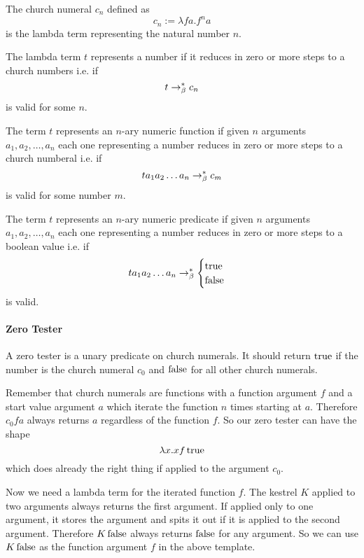 \begin{definition}
  The church numeral $c_n$ defined as
  $$ c_n := \lambda f a. f^n a$$
  is the lambda term representing the natural number $n$.
\end{definition}

\begin{definition}
  The lambda term $t$ represents a number if it reduces in zero or more steps
  to a church numbers i.e. if $$t \to^*_\beta c_n$$ is valid for some $n$.
\end{definition}

\begin{definition}
  The term $t$ represents an $n$-ary numeric function if given $n$ arguments
  $a_1, a_2, \ldots, a_n$ each one representing a number reduces in zero or
  more steps to a church numberal i.e. if $$t a_1 a_2 \ldots a_n \to^*_\beta
  c_m$$ is valid for some number $m$.
\end{definition}


\begin{definition}
  The term $t$ represents an $n$-ary numeric predicate if given $n$ arguments
  $a_1, a_2, \ldots, a_n$ each one representing a number reduces in zero or
  more steps to a boolean value i.e. if
  $$t a_1 a_2 \ldots a_n \to^*_\beta
  \begin{cases} \text{true} \\ \text{false}
  \end{cases}
  $$ is valid.
\end{definition}


\paragraph{Zero Tester}

A zero tester is a unary predicate on church numerals. It should return
$\text{true}$ if the number is the church numeral $c_0$ and $\text{false}$ for all other
church numerals.

Remember that church numerals are functions with a function argument $f$ and a
start value argument $a$ which iterate the function $n$ times starting at
$a$. Therefore $c_0 f a$ always returns $a$ regardless of the function $f$. So
our zero tester can have the shape $$\lambda x. x f\, \text{true}$$ which does already
the right thing if applied to the argument $c_0$.

Now we need a lambda term for the iterated function $f$. The kestrel $K$
applied to two arguments always returns the first argument. If applied only to
one argument, it stores the argument and spits it out if it is applied to the
second argument. Therefore $K\,\text{false}$ always returns $\text{false}$ for any
argument. So we can use $K\,\text{false}$ as the function argument $f$ in the above
template.

